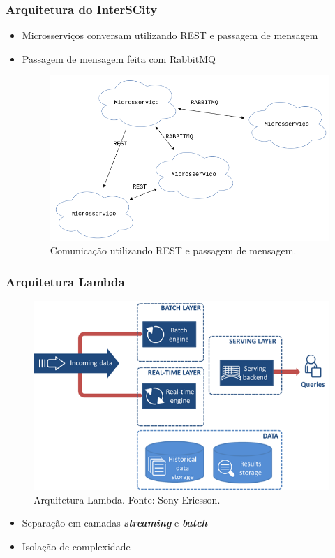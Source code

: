 \documentclass{beamer}
\begin{document}
    \begin{frame}
        \frametitle{Arquitetura do InterSCity}
        \begin{itemize}
            \item Microsserviços conversam utilizando REST e passagem de mensagem
            \item Passagem de mensagem feita com RabbitMQ
                \begin{figure}
                    \includegraphics[scale=0.3]{figures/communication.png}
                    \caption{Comunicação utilizando REST e passagem de mensagem.}
                \end{figure}
        \end{itemize}
    \end{frame}

    \begin{frame}
        \frametitle{Arquitetura Lambda}
        \begin{figure}
            \includegraphics[scale=0.5]{figures/LambdaArchitecture.png}
            \caption{Arquitetura Lambda. Fonte: Sony Ericsson.}
        \end{figure}
        \begin{itemize}
            \item Separação em camadas \textbf{\textit{streaming}} e
                \textbf{\textit{batch}}
            \item Isolação de complexidade
        \end{itemize}
    \end{frame}
    
\end{document}
